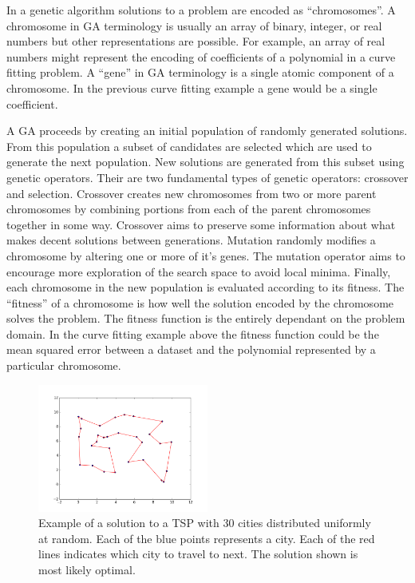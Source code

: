 \documentclass[journal]{IEEEtran}
\begin{document}
In a genetic algorithm solutions to a problem are encoded as “chromosomes”. A chromosome in GA terminology is usually an array of binary, integer, or real numbers but other representations are possible. For example, an array of real numbers might represent the encoding of coefficients of a polynomial in a curve fitting problem. A “gene” in GA terminology is a single atomic component of a chromosome. In the previous curve fitting example a gene would be a single coefficient.

A GA proceeds by creating an initial population of randomly generated solutions. From this population a subset of candidates are selected which are used to generate the next population. New solutions are generated from this subset using genetic operators. Their are two fundamental types of genetic operators: crossover and selection. Crossover creates new chromosomes from two or more parent chromosomes by combining portions from each of the parent chromosomes together in some way. Crossover aims to preserve some information about what makes decent solutions between generations. Mutation randomly modifies a chromosome by altering one or more of it’s genes. The mutation operator aims to encourage more exploration of the search space to avoid local minima. Finally, each chromosome in the new population is evaluated according to its fitness. The “fitness” of a chromosome is how well the solution encoded by the chromosome solves the problem. The fitness function is the entirely dependant on the problem domain. In the curve fitting example above the fitness function could be the mean squared error between a dataset and the polynomial represented by a particular chromosome.

\begin{figure}[H]
\centering
\includegraphics[width=0.5\textwidth]{img/tsp_solution_example.png}
\caption{Example of a solution to a TSP with 30 cities distributed uniformly at random. Each of the blue points represents a city. Each of the red lines indicates which city to travel to next. The solution shown is most likely optimal.}
\label{fig:tsp-example}
\end{figure}
\end{document}
